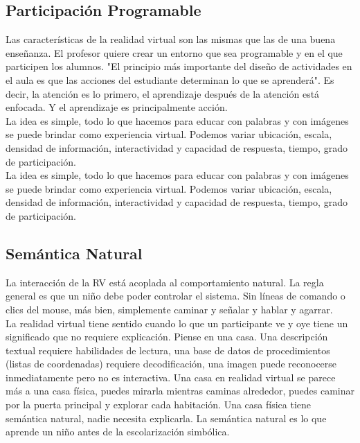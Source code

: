 \subsection{Participación Programable}
Las características de la realidad virtual son las mismas que las de una buena enseñanza. El profesor quiere crear un entorno que sea programable y en el que 
participen los alumnos. "El principio más importante del diseño de actividades en el aula es que las acciones del estudiante determinan lo que se aprenderá". 
Es decir, la atención es lo primero, el aprendizaje después de la atención está enfocada. Y el aprendizaje es principalmente acción.\\ 
La idea es simple, todo lo que hacemos para educar con palabras y con imágenes se puede brindar como experiencia virtual. Podemos variar ubicación, escala, densidad de información, 
interactividad y capacidad de respuesta, tiempo, grado de participación.\\
La idea es simple, todo lo que hacemos para educar con palabras y con imágenes se puede brindar como experiencia virtual. Podemos variar ubicación, escala, densidad de información, 
interactividad y capacidad de respuesta, tiempo, grado de participación.
\subsection{Semántica Natural}
La interacción de la RV está acoplada al comportamiento natural. La regla general es que un niño debe poder controlar el sistema. Sin líneas de comando o clics del mouse, 
más bien, simplemente caminar y señalar y hablar y agarrar.\\
La realidad virtual tiene sentido cuando lo que un participante ve y oye tiene un significado que no requiere explicación. Piense en una casa. 
Una descripción textual requiere habilidades de lectura, una base de datos de procedimientos (listas de coordenadas) requiere decodificación, una imagen puede reconocerse 
inmediatamente pero no es interactiva. Una casa en realidad virtual se parece más a una casa física, puedes mirarla mientras caminas alrededor, puedes caminar por la puerta 
principal y explorar cada habitación. Una casa física tiene semántica natural, nadie necesita explicarla. La semántica natural es lo que aprende un niño antes de la escolarización 
simbólica.

